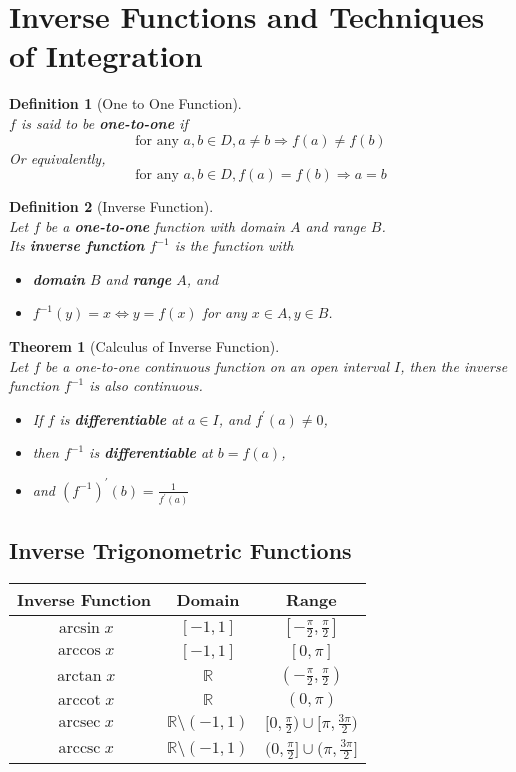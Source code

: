 \documentclass[12pt]{article}
\newtheorem{definition}{Definition}[section]
\newtheorem{theorem}{Theorem}[section]
\theoremstyle{definition}
\DeclareMathOperator{\arcsec}{arcsec}
\DeclareMathOperator{\arccot}{arccot}
\DeclareMathOperator{\arccsc}{arccsc}
\begin{document}
\section{Inverse Functions and Techniques of Integration}
\begin{definition}[One to One Function]
\hfill\\
\normalfont $f$ is said to be \textbf{one-to-one} if
\[
\text{for any }a,b\in D, a\neq b\Rightarrow f(a)\neq f(b)
\]
Or equivalently,
\[
\text{for any }a,b\in D, f(a)=f(b)\Rightarrow a=b
\]
\end{definition}
\begin{definition}[Inverse Function]
\hfill\\
\normalfont Let $f$ be a \textbf{one-to-one} function with domain $A$ and range $B$.\\
Its \textbf{inverse function} $f^{-1}$ is the function with 
\begin{itemize}
\item \textbf{domain} $B$ and \textbf{range} $A$, and
\item $f^{-1}(y)=x\Leftrightarrow y=f(x)$ for any $x\in A, y \in B$.
\end{itemize}
\end{definition}
\begin{theorem}[Calculus of Inverse Function]
\hfill\\
\normalfont Let $f$ be a one-to-one continuous function on an open interval $I$, then the inverse function $f^{-1}$ is also continuous.
\begin{itemize}
\item If $f$ is \textbf{differentiable} at $a\in I$, and $f^\prime (a)\neq 0$,
\item then $f^{-1}$ is \textbf{differentiable} at $b=f(a)$,
\item[] and $(f^{-1})^\prime (b) = \frac{1}{f^\prime(a)}$
\end{itemize}
\end{theorem}
\subsection{Inverse Trigonometric Functions}
\begin{table}[h]
\centering
\begin{tabular}{|c|c|c|}
\hline
Inverse Function&Domain&Range\\\hline
$\arcsin x$&$[-1,1]$&$[-\frac{\pi}{2},\frac{\pi}{2}]$\\\hline
$\arccos x$&$[-1,1]$&$[0,\pi]$\\\hline
$\arctan x$&$\mathbb{R}$&$(-\frac{\pi}{2},\frac{\pi}{2})$\\\hline
$\arccot x$&$\mathbb{R}$&$(0,\pi)$\\\hline
$\arcsec x$&$\mathbb{R}\setminus (-1,1)$&$[0,\frac{\pi}{2})\cup[\pi,\frac{3\pi}{2})$\\\hline
$\arccsc x$&$\mathbb{R}\setminus (-1,1)$&$(0,\frac{\pi}{2}]\cup(\pi,\frac{3\pi}{2}]$\\\hline
\end{tabular}
\end{table}
\end{document}
